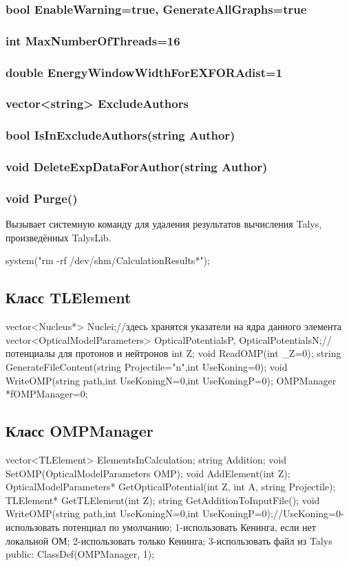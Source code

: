 \documentclass[a4paper,12pt]{extarticle}
\begin{document}
\subsubsection{bool EnableWarning=true, GenerateAllGraphs=true}

\subsubsection{int MaxNumberOfThreads=16}

\subsubsection{double EnergyWindowWidthForEXFORAdist=1}

\subsubsection{vector<string> ExcludeAuthors}

\subsubsection{bool IsInExcludeAuthors(string Author)}

\subsubsection{void DeleteExpDataForAuthor(string Author)}

\subsubsection{void Purge()}
Вызывает системную команду для удаления результатов вычисления Talys, произведённых TalysLib.

system("rm -rf /dev/shm/CalculationResults*");

\subsection{Класс TLElement}
vector<Nucleus*> Nuclei;//здесь хранятся указатели на ядра данного элемента
vector<OpticalModelParameters> OpticalPotentialsP, OpticalPotentialsN;//потенциалы для протонов и нейтронов
int Z;
void ReadOMP(int _Z=0);
string GenerateFileContent(string Projectile="n",int UseKoning=0);
void WriteOMP(string path,int UseKoningN=0,int UseKoningP=0);
OMPManager *fOMPManager=0;

\subsection{Класс OMPManager}
vector<TLElement> ElementsInCalculation;
string Addition;
void SetOMP(OpticalModelParameters OMP);
void AddElement(int Z);
OpticalModelParameters* GetOpticalPotential(int Z, int A, string Projectile);
TLElement* GetTLElement(int Z);
string GetAdditionToInputFile();
void WriteOMP(string path,int UseKoningN=0,int UseKoningP=0);//UseKoning=0-использовать потенциал по умолчанию; 1-использовать Кенинга, если нет локальной ОМ; 2-использовать только Кенинга; 3-использовать файл из Talys
public:
ClassDef(OMPManager, 1);
\end{document}
